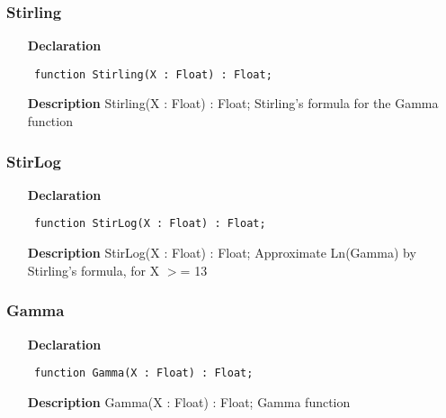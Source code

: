 \documentclass[12pt,a4paper,oneside]{report}
\newcommand{\declarationitem}[1]{\textbf{#1}}
\newcommand{\descriptiontitle}[1]{\textbf{#1}}
\newcommand{\code}[1]{\texttt{#1}}
\begin{document}
\subsubsection{Stirling}
\label{ugamma-Stirling}
\begin{itemize}\item[\declarationitem{Declaration}\hfill]
	\begin{flushleft}
		\code{
			function Stirling(X : Float) : Float;}
		
	\end{flushleft}
	
	\par
	\item[\descriptiontitle{Description}]
	Stirling(X : Float) : Float; Stirling's formula for the Gamma function
	
\end{itemize}
\subsubsection{StirLog}
\label{ugamma-StirLog}
\begin{itemize}\item[\declarationitem{Declaration}\hfill]
	\begin{flushleft}
		\code{
			function StirLog(X : Float) : Float;}
		
	\end{flushleft}
	
	\par
	\item[\descriptiontitle{Description}]
	StirLog(X : Float) : Float; Approximate Ln(Gamma) by Stirling's formula, for X {$>$}= 13
	
\end{itemize}
\subsubsection{Gamma}
\label{ugamma-Gamma}
\begin{itemize}\item[\declarationitem{Declaration}\hfill]
	\begin{flushleft}
		\code{
			function Gamma(X : Float) : Float;}
		
	\end{flushleft}
	
	\par
	\item[\descriptiontitle{Description}]
	Gamma(X : Float) : Float; Gamma function
	
\end{itemize}
\end{document}
